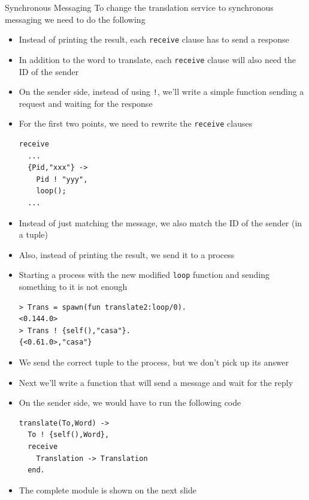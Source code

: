 \documentclass[12pt,xcolor=svgnames]{beamer}
\begin{document}
\begin{frame}{Synchronous Messaging}
To change the translation service to synchronous messaging we need to do the following
\begin{itemize}
\item Instead of printing the result, each \texttt{receive} clause has to send a response
\item In addition to the word to translate, each \texttt{receive} clause will also need the ID of the sender
\item On the sender side, instead of using \texttt{!}, we'll write a 
simple function sending a request and waiting for the response
\end{itemize}

\framebreak

\begin{itemize}
\item For the first two points, we need to rewrite the \texttt{receive} clauses
\begin{Verbatim}
receive
  ...
  {Pid,"xxx"} ->
    Pid ! "yyy",
    loop();
  ...
\end{Verbatim}
\item Instead of just matching the message, we also match the ID of the sender (in a tuple)
\item Also, instead of printing the result, we send it to a process
\end{itemize}

\framebreak

\begin{itemize}
\item Starting a process with the new modified \texttt{loop} function and sending something to it is not enough
\begin{Verbatim}
> Trans = spawn(fun translate2:loop/0).
<0.144.0>
> Trans ! {self(),"casa"}.
{<0.61.0>,"casa"}
\end{Verbatim}
\item We send the correct tuple to the process, but we don't pick up its answer
\item Next we'll write a function that will send a message and wait for the reply
\end{itemize}

\framebreak

\begin{itemize}
\item On the sender side, we would have to run the following code
\begin{Verbatim}
translate(To,Word) ->
  To ! {self(),Word},
  receive
    Translation -> Translation
  end.
\end{Verbatim}
\item The complete module is shown on the next slide
\end{itemize}


\end{frame}
\end{document}
